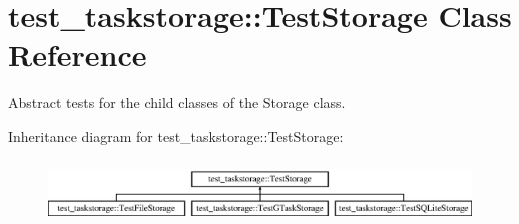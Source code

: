 \hypertarget{classtest__taskstorage_1_1TestStorage}{
\section{test\-\_\-taskstorage\-:\-:\-Test\-Storage \-Class \-Reference}
\label{classtest__taskstorage_1_1TestStorage}
}


\-Abstract tests for the child classes of the \-Storage class.  


\-Inheritance diagram for test\-\_\-taskstorage\-:\-:\-Test\-Storage\-:\begin{figure}[H]
\begin{center}
\leavevmode
\includegraphics[height=1.689291cm]{classtest__taskstorage_1_1TestStorage}
\end{center}
\end{figure}
